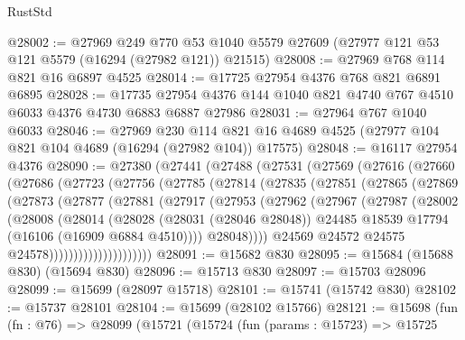 \begin{lexlean}{RustStd}
\begin{coremodule}
@28002 := @27969
    @249
    @770
    @53
    @1040
    @5579
    @27609
    (@27977 @121 @53 @121 @5579 (@16294 (@27982 @121)) @21515)
@28008 := @27969 @768 @114 @821 @16 @6897 @4525
@28014 := @17725 @27954 @4376 @768 @821 @6891 @6895
@28028 := @17735 @27954 @4376 @144 @1040 @821 @4740 @767 @4510 @6033 @4376 @4730 @6883 @6887 @27986
@28031 := @27964 @767 @1040 @6033
@28046 := @27969
    @230
    @114
    @821
    @16
    @4689
    @4525
    (@27977 @104 @821 @104 @4689 (@16294 (@27982 @104)) @17575)
@28048 := @16117 @27954 @4376
@28090 := @27380
    (@27441
      (@27488
        (@27531
          (@27569
            (@27616
              (@27660
                (@27686
                  (@27723
                    (@27756
                      (@27785
                        (@27814
                          (@27835
                            (@27851
                              (@27865
                                (@27869
                                  (@27873
                                    (@27877
                                      (@27881
                                        (@27917
                                          (@27953
                                            (@27962
                                              (@27967
                                                (@27987
                                                  (@28002
                                                    (@28008
                                                      (@28014
                                                        (@28028
                                                          (@28031 (@28046 @28048))
                                                          @24485
                                                          @18539
                                                          @17794
                                                          (@16106 (@16909 @6884 @4510))))
                                                      @28048))))
                                              @24569
                                              @24572
                                              @24575
                                              @24578)))))))))))))))))))))
@28091 := @15682 @830
@28095 := @15684 (@15688 @830) (@15694 @830)
@28096 := @15713 @830
@28097 := @15703 @28096
@28099 := @15699 (@28097 @15718)
@28101 := @15741 (@15742 @830)
@28102 := @15737 @28101
@28104 := @15699 (@28102 @15766)
@28121 := @15698
    (fun (fn : @76) =>
    @28099
      (@15721
        (@15724
          (fun (params : @15723) =>
          @15725

\end{coremodule}
\end{lexlean}
